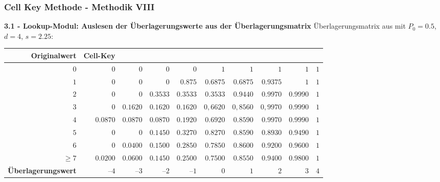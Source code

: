 \documentclass[aspectratio=169]{beamer}
\begin{document}
\begin{frame}{}
	\frametitle{Cell Key Methode - Methodik VIII}
    \textbf{3.1 - Lookup-Modul:  Auslesen der Überlagerungswerte aus der Überlagerungsmatrix}
    Überlagerungsmatrix aus \cite{Höhne} mit $P_0 = 0.5$, $d = 4$, $s = 2.25$:
    \begin{footnotesize}
    \begin{center}
        \begin{tabular}{ r r r r r r r r r r }
            \textbf{Originalwert} \vline & \textbf{Cell-Key} & & & & & & & & \\ 
            \hline
            $0$ \vline & $0$ & $0$ & $0$ & $0$ & $1$ & $1$ & $1$ & $1$ & $1$ \\
            $1$ \vline & $0$ & $0$ & $0$ & $0.875$ & $0.6875$ & $0.6875$ & $0.9375$ & $1$ & $1$ \\
            $2$ \vline & $0$ & $0$ & $0.3533$ & $0.3533$ & $0.3533$ & $0.9440$ & $0.9970$ & $0.9990$ & $1$ \\
            $3$ \vline & $0$ & $0.1620$ & $0.1620$ & $0.1620$ & $0,6620$ & $0,8560$ & $0,9970$ & $0.9990$ & $1$ \\
            $4$ \vline & $0.0870$ & $0.0870$ & $0.0870$ & $0.1920$ & $0.6920$ & $0.8590$ & $0.9970$ & $0.9990$ & $1$ \\
            $5$ \vline & $0$ & $0$ & $0.1450$ & $0.3270$ & $0.8270$ & $0.8590$ & $0.8930$ & $0.9490$ & $1$ \\
            $6$ \vline & $0$ & $0.0400$ & $0.1500$ & $0.2850$ & $0.7850$ & $0.8600$ & $0.9200$ & $0.9600$ & $1$ \\
            $\geq 7$ \vline & $0.0200$ & $0.0600$ & $0.1450$ & $0.2500$ & $0.7500$ & $0.8550$ & $0.9400$ & $0.9800$ & $1$ \\
            \hline
            \textbf{Überlagerungswert} \vline & $–4$ & $–3$ & $–2$ & $–1$ & $0$ & $1$ & $2$ & $3$ & $4$
        \end{tabular}
    \end{center}
    \end{footnotesize}
\end{frame}
\end{document}

